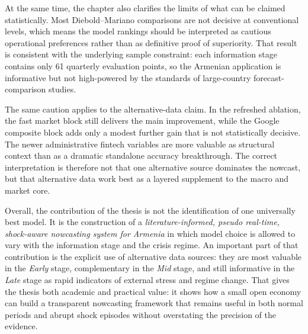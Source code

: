 \documentclass[12pt,a4paper]{article}
\begin{document}
At the same time, the chapter also clarifies the limits of what can be claimed statistically. Most Diebold--Mariano comparisons are not decisive at conventional levels, which means the model rankings should be interpreted as cautious operational preferences rather than as definitive proof of superiority. That result is consistent with the underlying sample constraint: each information stage contains only 61 quarterly evaluation points, so the Armenian application is informative but not high-powered by the standards of large-country forecast-comparison studies.

The same caution applies to the alternative-data claim. In the refreshed ablation, the fast market block still delivers the main improvement, while the Google composite block adds only a modest further gain that is not statistically decisive. The newer administrative fintech variables are more valuable as structural context than as a dramatic standalone accuracy breakthrough. The correct interpretation is therefore not that one alternative source dominates the nowcast, but that alternative data work best as a layered supplement to the macro and market core.

Overall, the contribution of the thesis is not the identification of one universally best model. It is the construction of a \textit{literature-informed, pseudo real-time, shock-aware nowcasting system for Armenia} in which model choice is allowed to vary with the information stage and the crisis regime. An important part of that contribution is the explicit use of alternative data sources: they are most valuable in the \textit{Early} stage, complementary in the \textit{Mid} stage, and still informative in the \textit{Late} stage as rapid indicators of external stress and regime change. That gives the thesis both academic and practical value: it shows how a small open economy can build a transparent nowcasting framework that remains useful in both normal periods and abrupt shock episodes without overstating the precision of the evidence.
\end{document}
